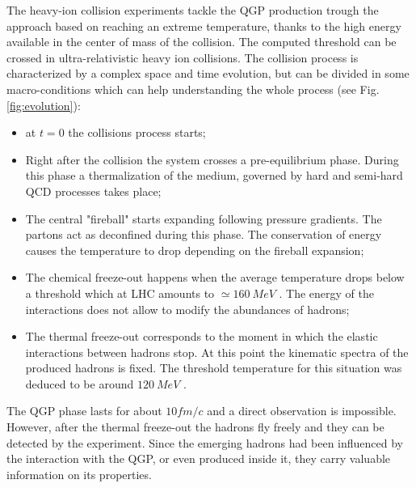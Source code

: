 The heavy-ion collision experiments tackle the QGP production trough the approach based on reaching an extreme temperature, thanks to the high energy available in the center of mass of the collision.
The computed threshold can be crossed in ultra-relativistic heavy ion collisions.
The collision process is characterized by a complex space and time evolution, but can be divided in some macro-conditions which can help understanding the whole process (see Fig. \ref{fig:evolution}):
\begin{itemize}
    \item at $t=0$ the collisions process starts;
    \item Right after the collision the system crosses a pre-equilibrium phase. During this phase a thermalization of the medium, governed by hard and semi-hard QCD processes takes place;
    \item The central "fireball" starts expanding following pressure gradients. The partons act as deconfined during this phase. The conservation of energy causes the temperature to drop depending on the fireball expansion;
    \item The chemical freeze-out happens when the average temperature drops below a threshold which at LHC amounts to $\simeq160\ MeV$ \cite{Kapoyannis:2017hcz}. The energy of the interactions does not allow to modify the abundances of hadrons;
    \item The thermal freeze-out corresponds to the moment in which the elastic interactions between hadrons stop. At this point the kinematic spectra of the produced hadrons is fixed. The threshold temperature for this situation was deduced to be around $120\ MeV$ \cite{Mukherjee:2012fb}.
\end{itemize}

The QGP phase lasts for about $10fm/c$ and a direct observation is impossible.
However, after the thermal freeze-out the hadrons fly freely and they can be detected by the experiment.
Since the emerging hadrons had been influenced by the interaction with the QGP, or even produced inside it, they carry valuable information on its properties.

